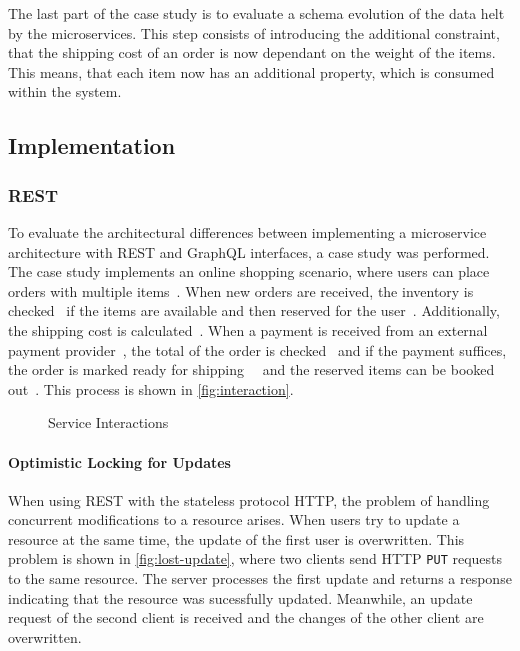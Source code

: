 The last part of the case study is to evaluate a schema evolution of the data helt by the microservices.
This step consists of introducing the additional constraint, that the shipping cost of an order is now dependant on the weight of the items.
This means, that each item now has an additional property, which is consumed within the system.

\subsection{Implementation}

\subsubsection{\acs{REST}}

To evaluate the architectural differences between implementing a microservice architecture with REST and GraphQL interfaces, a case study was performed.
The case study implements an online shopping scenario, where users can place orders with multiple items~\raisebox{.5pt}{\textcircled{\raisebox{-.9pt} {1}}}.
When new orders are received, the inventory is checked~\raisebox{.5pt}{\textcircled{\raisebox{-.9pt} {2}}} if the items are available and then reserved for the user~\raisebox{.5pt}{\textcircled{\raisebox{-.9pt} {3}}}.
Additionally, the shipping cost is calculated~\raisebox{.5pt}{\textcircled{\raisebox{-.9pt} {4}}}.
When a payment is received from an external payment provider~\raisebox{.5pt}{\textcircled{\raisebox{-.9pt} {5}}}, the total of the order is checked~\raisebox{.5pt}{\textcircled{\raisebox{-.9pt} {6}}} and if the payment suffices, the order is marked ready for shipping~\raisebox{.5pt}{\textcircled{\raisebox{-.9pt} {7}}}~\raisebox{.5pt}{\textcircled{\raisebox{-.9pt} {8}}} and the reserved items can be booked out~\raisebox{.5pt}{\textcircled{\raisebox{-.9pt} {9}}}.
This process is shown in \autoref{fig:interaction}.

\begin{figure}[!htb]
    \centering
    
    \caption{Service Interactions}
    \label{fig:interaction}
\end{figure}

\paragraph{Optimistic Locking for Updates}

When using \ac{REST} with the stateless protocol \ac{HTTP}, the problem of handling concurrent modifications to a resource arises.
When users try to update a resource at the same time, the update of the first user is overwritten.
This problem is shown in \autoref{fig:lost-update}, where two clients send \ac{HTTP} \texttt{PUT} requests to the same resource.
The server processes the first update and returns a response indicating that the resource was sucessfully updated.
Meanwhile, an update request of the second client is received and the changes of the other client are overwritten.


